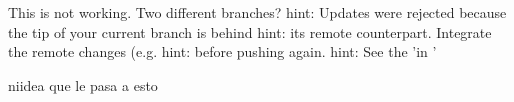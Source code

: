 This is not working. Two different branches?
hint: Updates were rejected because the tip of your current branch is behind
hint: its remote counterpart. Integrate the remote changes (e.g.
hint:  before pushing again.
hint: See the 'in '

niidea que le pasa a esto

